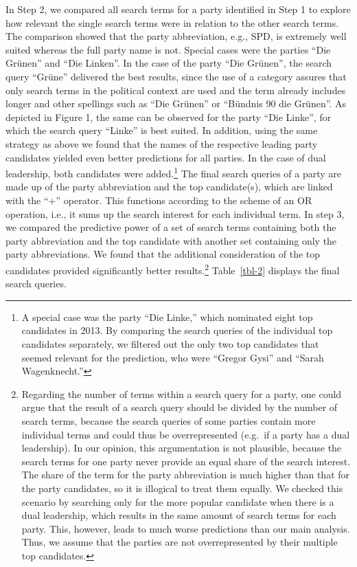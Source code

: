 \documentclass[
  letterpaper,
  DIV=11,
  numbers=noendperiod]{scrartcl}
\begin{document}
In Step 2, we compared all search terms for a party identified in Step 1
to explore how relevant the single search terms were in relation to the
other search terms. The comparison showed that the party abbreviation,
e.g., SPD, is extremely well suited whereas the full party name is not.
Special cases were the parties ``Die Grünen'' and ``Die Linken''. In the
case of the party ``Die Grünen'', the search query ``Grüne'' delivered
the best results, since the use of a category assures that only search
terms in the political context are used and the term already includes
longer and other spellings such as ``Die Grünen'' or ``Bündnis 90 die
Grünen''. As depicted in Figure 1, the same can be observed for the
party ``Die Linke'', for which the search query ``Linke'' is best
suited. In addition, using the same strategy as above we found that the
names of the respective leading party candidates yielded even better
predictions for all parties. In the case of dual leadership, both
candidates were added.\footnote{A special case was the party ``Die
  Linke,'' which nominated eight top candidates in 2013. By comparing
  the search queries of the individual top candidates separately, we
  ﬁltered out the only two top candidates that seemed relevant for the
  prediction, who were ``Gregor Gysi'' and ``Sarah Wagenknecht.''} The
ﬁnal search queries of a party are made up of the party abbreviation and
the top candidate(s), which are linked with the ``+'' operator. This
functions according to the scheme of an OR operation, i.e., it sums up
the search interest for each individual term. In step 3, we compared the
predictive power of a set of search terms containing both the party
abbreviation and the top candidate with another set containing only the
party abbreviations. We found that the additional consideration of the
top candidates provided signiﬁcantly better results.\footnote{Regarding
  the number of terms within a search query for a party, one could argue
  that the result of a search query should be divided by the number of
  search terms, because the search queries of some parties contain more
  individual terms and could thus be overrepresented (e.g.~if a party
  has a dual leadership). In our opinion, this argumentation is not
  plausible, because the search terms for one party never provide an
  equal share of the search interest. The share of the term for the
  party abbreviation is much higher than that for the party candidates,
  so it is illogical to treat them equally. We checked this scenario by
  searching only for the more popular candidate when there is a dual
  leadership, which results in the same amount of search terms for each
  party. This, however, leads to much worse predictions than our main
  analysis. Thus, we assume that the parties are not overrepresented by
  their multiple top candidates.} Table~\ref{tbl-2} displays the final
search queries.
\end{document}
